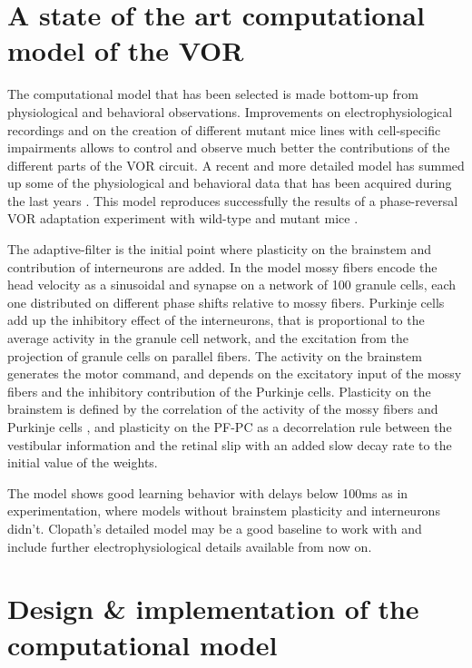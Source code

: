\documentclass[12pt, a4paper,twoside]{tesi_upf}
\begin{document}
\section{A state of the art computational model of the VOR}

The computational model that has been selected is made bottom-up from physiological and behavioral observations. Improvements on electrophysiological recordings and on the creation of different mutant mice lines with cell-specific impairments allows to control and observe much better the contributions of the different parts of the VOR circuit. A recent and more detailed model has summed up some of the physiological and behavioral data that has been acquired during the last years \cite{Clopath2014}. This model reproduces successfully the results of a phase-reversal VOR adaptation experiment with wild-type and mutant mice \cite{Wulff2009a}.

The adaptive-filter is the initial point where plasticity on the brainstem and contribution of interneurons are added. In the model mossy fibers encode the head velocity as a sinusoidal \cite{Manuscript2009} and synapse on a network of 100 granule cells, each one distributed on different phase shifts relative to mossy fibers. Purkinje cells add up the inhibitory effect of the interneurons, that is proportional to the average activity in the granule cell network, and the excitation from the projection of granule cells on parallel fibers. The activity on the brainstem generates the motor command, and depends on the excitatory input of the mossy fibers and the inhibitory contribution of the Purkinje cells. Plasticity on the brainstem is defined by the correlation of the activity of the mossy fibers and Purkinje cells \cite{Menzies2010}, and plasticity on the PF-PC as a decorrelation rule between the vestibular information and the retinal slip \cite{Dean2002} with an added slow decay rate to the initial value of the weights.

The model shows good learning behavior with delays below 100ms as in experimentation, where models without brainstem plasticity and interneurons didn't. Clopath's detailed model may be a good baseline to work with and include further electrophysiological details available from now on.

\section{Design \& implementation of the computational model}
\end{document}
